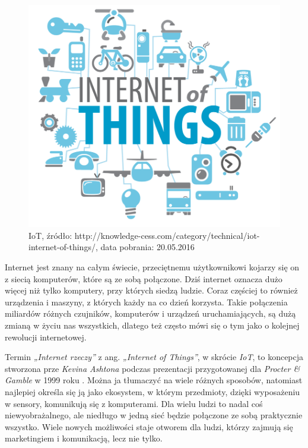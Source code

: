 \documentclass[brudnopis]{xmgr}
\begin{document}
\maketitle
\introduction

 
\begin{figure}[h]
\centering
\includegraphics[width=\textwidth]{iot_wstep}
\caption{IoT, źródło: http://knowledge-cess.com/category/technical/iot-internet-of-things/, data pobrania: 20.05.2016}
\label{fig:iot}
\end{figure}

Internet jest znany na całym świecie, przeciętnemu użytkownikowi
kojarzy się on z siecią komputerów, które są ze sobą połączone. Dziś internet oznacza dużo więcej niż tylko komputery, przy których siedzą ludzie. Coraz częściej to również urządzenia i maszyny, z których każdy na co dzień korzysta. Takie połączenia miliardów różnych czujników, komputerów i urządzeń uruchamiających, są dużą zmianą w życiu nas wszystkich, dlatego też często mówi się o tym jako o kolejnej rewolucji internetowej.

Termin \emph{„Internet rzeczy”} z ang. \emph{„Internet of Things”}, w skrócie \emph{IoT}, to koncepcja stworzona prze \emph{Kevina Ashtona} podczas prezentacji przygotowanej dla \emph{Procter \& Gamble} w 1999 roku \cite{KA:2009:iot}. Można ja tłumaczyć na wiele różnych sposobów, natomiast najlepiej określa się ją jako ekosystem, w którym przedmioty, dzięki wyposażeniu w sensory, komunikują się z komputerami. Dla wielu ludzi to nadal coś niewyobrażalnego, ale niedługo w jedną sieć będzie połączone ze sobą praktycznie wszystko. Wiele nowych możliwości staje otworem dla ludzi, którzy zajmują się marketingiem i komunikacją, lecz nie tylko. 
\end{document}
